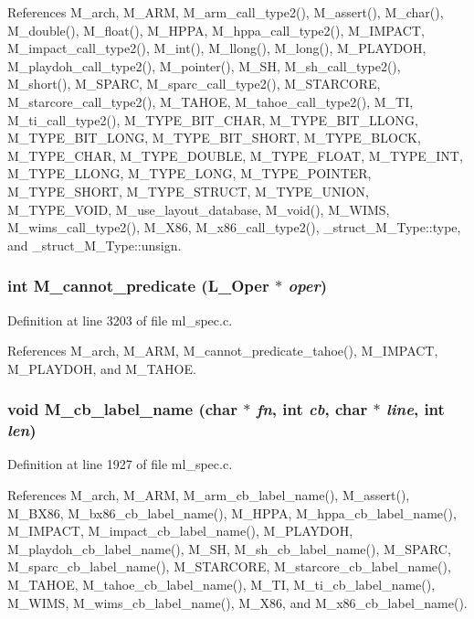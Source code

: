 References M\_\-arch, M\_\-ARM, M\_\-arm\_\-call\_\-type2(), M\_\-assert(), M\_\-char(), M\_\-double(), M\_\-float(), M\_\-HPPA, M\_\-hppa\_\-call\_\-type2(), M\_\-IMPACT, M\_\-impact\_\-call\_\-type2(), M\_\-int(), M\_\-llong(), M\_\-long(), M\_\-PLAYDOH, M\_\-playdoh\_\-call\_\-type2(), M\_\-pointer(), M\_\-SH, M\_\-sh\_\-call\_\-type2(), M\_\-short(), M\_\-SPARC, M\_\-sparc\_\-call\_\-type2(), M\_\-STARCORE, M\_\-starcore\_\-call\_\-type2(), M\_\-TAHOE, M\_\-tahoe\_\-call\_\-type2(), M\_\-TI, M\_\-ti\_\-call\_\-type2(), M\_\-TYPE\_\-BIT\_\-CHAR, M\_\-TYPE\_\-BIT\_\-LLONG, M\_\-TYPE\_\-BIT\_\-LONG, M\_\-TYPE\_\-BIT\_\-SHORT, M\_\-TYPE\_\-BLOCK, M\_\-TYPE\_\-CHAR, M\_\-TYPE\_\-DOUBLE, M\_\-TYPE\_\-FLOAT, M\_\-TYPE\_\-INT, M\_\-TYPE\_\-LLONG, M\_\-TYPE\_\-LONG, M\_\-TYPE\_\-POINTER, M\_\-TYPE\_\-SHORT, M\_\-TYPE\_\-STRUCT, M\_\-TYPE\_\-UNION, M\_\-TYPE\_\-VOID, M\_\-use\_\-layout\_\-database, M\_\-void(), M\_\-WIMS, M\_\-wims\_\-call\_\-type2(), M\_\-X86, M\_\-x86\_\-call\_\-type2(), \_\-struct\_\-M\_\-Type::type, and \_\-struct\_\-M\_\-Type::unsign.
\subsubsection{\setlength{\rightskip}{0pt plus 5cm}int M\_\-cannot\_\-predicate (L\_\-Oper $\ast$ {\em oper})}\label{ml__spec_8c_c2ab6076679f78fe56a6b2fc04f42bdb}




Definition at line 3203 of file ml\_\-spec.c.

References M\_\-arch, M\_\-ARM, M\_\-cannot\_\-predicate\_\-tahoe(), M\_\-IMPACT, M\_\-PLAYDOH, and M\_\-TAHOE.
\subsubsection{\setlength{\rightskip}{0pt plus 5cm}void M\_\-cb\_\-label\_\-name (char $\ast$ {\em fn}, int {\em cb}, char $\ast$ {\em line}, int {\em len})}\label{ml__spec_8c_5dcb9207ae2da55868286ad83d7a9edc}




Definition at line 1927 of file ml\_\-spec.c.

References M\_\-arch, M\_\-ARM, M\_\-arm\_\-cb\_\-label\_\-name(), M\_\-assert(), M\_\-BX86, M\_\-bx86\_\-cb\_\-label\_\-name(), M\_\-HPPA, M\_\-hppa\_\-cb\_\-label\_\-name(), M\_\-IMPACT, M\_\-impact\_\-cb\_\-label\_\-name(), M\_\-PLAYDOH, M\_\-playdoh\_\-cb\_\-label\_\-name(), M\_\-SH, M\_\-sh\_\-cb\_\-label\_\-name(), M\_\-SPARC, M\_\-sparc\_\-cb\_\-label\_\-name(), M\_\-STARCORE, M\_\-starcore\_\-cb\_\-label\_\-name(), M\_\-TAHOE, M\_\-tahoe\_\-cb\_\-label\_\-name(), M\_\-TI, M\_\-ti\_\-cb\_\-label\_\-name(), M\_\-WIMS, M\_\-wims\_\-cb\_\-label\_\-name(), M\_\-X86, and M\_\-x86\_\-cb\_\-label\_\-name().
